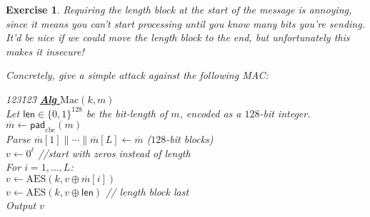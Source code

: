 \documentclass[11pt]{article}
\newtheorem{exercise}{Exercise}
\newcommand{\MAC}{\mathrm{Mac}}
\newcommand{\leng}{\mathsf{len}}
\newcommand{\algorithm}[1]{\textbf{Alg} {#1}}
\newcommand{\bits}{\{0,1\}}
\newcommand{\barm}{\overline{m}}
\newcommand{\aes}{\mathrm{AES}}
\newcommand{\cbcmacpad}{\mathsf{pad}_{\mathrm{cbc}}}
\begin{document}
\begin{exercise}
    Requiring the length block at the start of the message is annoying,
    since it means you can't start processing until you know many bits
    you're sending. It'd be nice if we could move the length block
    to the end, but unfortunately this makes it insecure!

    Concretely, give a simple attack against the following MAC:
    \begin{center}
        \begin{minipage}{2in}\begin{tabbing}
            123\=123\=\kill
            \underline{\algorithm{$\MAC(k,m)$}} \\[2pt]
            \> Let $\leng\in\bits^{128}$ be the bit-length of $m$, encoded
            as a $128$-bit integer.\\
            \> $\barm \gets \cbcmacpad(m)$\\
            \> Parse $\barm[1]\|\cdots\|\barm[L]\gets\barm$  \emph{($128$-bit
            blocks)}\\
            \> $v \gets 0^\ell$ //start with zeros instead of length\\
            \> For $i=1,\ldots,L$: \\
            \> \> $v \gets \aes(k,v\oplus\barm[i])$\\
            \> $v \gets \aes(k,v\oplus\leng)$ // length block last\\
            \> Output $v$
        \end{tabbing}\end{minipage}
    \end{center}
\end{exercise}
\end{document}
